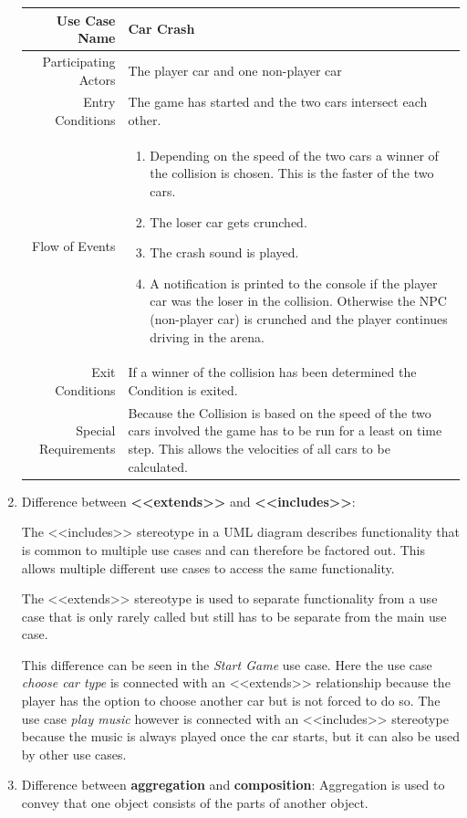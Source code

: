 \documentclass[a4paper, 10pt]{article}
\begin{document}
\begin{enumerate}
    \begin{tabularx}{\linewidth}{ r X }
        \hline
        Use Case Name & Car Crash \\
        \hline
        Participating Actors & The player car and one non-player car \\
        \hline
        Entry Conditions & The game has started and the two cars intersect each other. \\
        \hline
        Flow of Events & 
        \begin{enumerate}
            \item Depending on the speed of the two cars a winner of the collision is chosen. This
            is the faster of the two cars.
            \item The loser car gets crunched.
            \item The crash sound is played.
            \item A notification is printed to the console if the player car was the loser in the collision. 
            Otherwise the NPC (non-player car) is crunched and the player continues driving in the arena.
        \end{enumerate}
        \\
        \hline
        Exit Conditions & If a winner of the collision has been determined the Condition is exited. \\
        \hline
        Special Requirements & 
        Because the Collision is based on the speed of the two cars involved the game has to be run for 
        a least on time step. This allows the velocities of all cars to be calculated.
         \\
        \hline
    \end{tabularx}
    \item Difference between \textbf{<<extends>>} and \textbf{<<includes>>}:

        The <<includes>> stereotype in a UML diagram describes functionality that 
        is common to multiple use cases and can therefore be factored out.
        This allows multiple different use cases to access the same functionality.

        The <<extends>> stereotype is used to separate functionality from a use case
        that is only rarely called but still has to be separate from the main use case.

        This difference can be seen in the \textit{Start Game} use case. Here the use case 
        \textit{choose car type} is connected with an <<extends>> relationship because the 
        player has the option to choose another car but is not forced to do so. 
        The use case \textit{play music} however is connected with an <<includes>> stereotype 
        because the music is always played once the car starts, but it can also be used by
        other use cases. 
    \item Difference between \textbf{aggregation} and \textbf{composition}:
        Aggregation is used to convey that one object consists of the parts of another object.


\end{enumerate}
\end{document}

